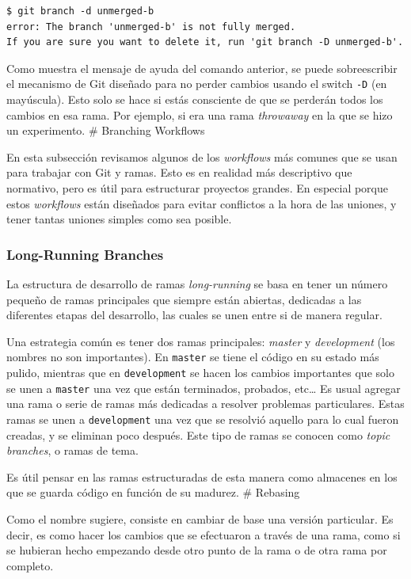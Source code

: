 \documentclass[spanish, 12pt, a4paper]{article}
\begin{document}
\begin{lstlisting}
$ git branch -d unmerged-b
error: The branch 'unmerged-b' is not fully merged.
If you are sure you want to delete it, run 'git branch -D unmerged-b'.
\end{lstlisting}

Como muestra el mensaje de ayuda del comando anterior, se puede
sobreescribir el mecanismo de Git diseñado para no perder cambios usando
el switch \passthrough{\lstinline!-D!} (en mayúscula). Esto solo se hace
si estás consciente de que se perderán todos los cambios en esa rama.
Por ejemplo, si era una rama \emph{throwaway} en la que se hizo un
experimento. \# Branching Workflows

En esta subsección revisamos algunos de los \emph{workflows} más comunes
que se usan para trabajar con Git y ramas. Esto es en realidad más
descriptivo que normativo, pero es útil para estructurar proyectos
grandes. En especial porque estos \emph{workflows} están diseñados para
evitar conflictos a la hora de las uniones, y tener tantas uniones
simples como sea posible.

\subsubsection{Long-Running Branches}

La estructura de desarrollo de ramas \emph{long-running} se basa en
tener un número pequeño de ramas principales que siempre están abiertas,
dedicadas a las diferentes etapas del desarrollo, las cuales se unen
entre si de manera regular.

Una estrategia común es tener dos ramas principales: \emph{master} y
\emph{development} (los nombres no son importantes). En
\passthrough{\lstinline!master!} se tiene el código en su estado más
pulido, mientras que en \passthrough{\lstinline!development!} se hacen
los cambios importantes que solo se unen a
\passthrough{\lstinline!master!} una vez que están terminados, probados,
etc\ldots{} Es usual agregar una rama o serie de ramas más dedicadas a
resolver problemas particulares. Estas ramas se unen a
\passthrough{\lstinline!development!} una vez que se resolvió aquello
para lo cual fueron creadas, y se eliminan poco después. Este tipo de
ramas se conocen como \emph{topic branches}, o ramas de tema.

Es útil pensar en las ramas estructuradas de esta manera como almacenes
en los que se guarda código en función de su madurez. \# Rebasing

Como el nombre sugiere, consiste en cambiar de base una versión
particular. Es decir, es como hacer los cambios que se efectuaron a
través de una rama, como si se hubieran hecho empezando desde otro punto
de la rama o de otra rama por completo.
\end{document}
